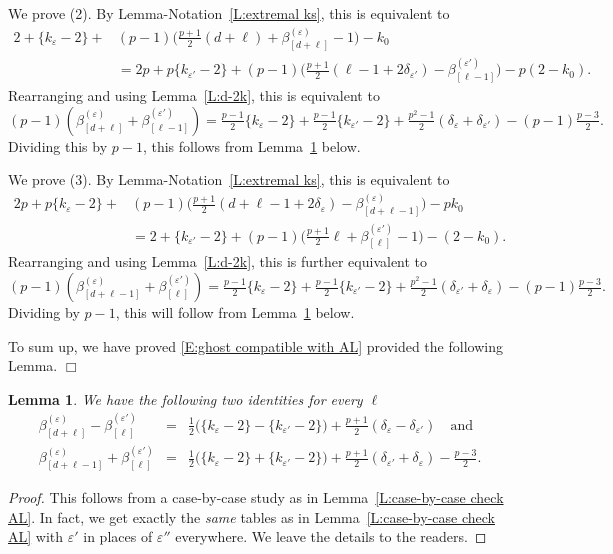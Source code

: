 \documentclass[12pt]{amsart}
\newtheorem{lemma}[subsection]{Lemma}
\theoremstyle{definition}
\numberwithin{equation}{subsection}
\begin{document}
We prove (2). By Lemma-Notation~\ref{L:extremal ks}, this is equivalent to
\begin{align*}
2 +\{k_{\varepsilon} -2\} + &(p-1) \big(\tfrac{p+1}2 (d+\ell) +\beta_{[d+\ell]}^{(\varepsilon)}-1\big) - k_0\\ & = 
2p +p\{k_{\varepsilon'} -2\} + (p-1) \big(\tfrac{p+1}2 ( \ell-1+2\delta_{\varepsilon'})- \beta_{[\ell-1]}^{(\varepsilon')}\big)   -p(2-k_0).
\end{align*}
Rearranging and using Lemma~\ref{L:d-2k}, this is equivalent to
$$  (p-1)(\beta_{[d+\ell]}^{(\varepsilon)}+ \beta_{[\ell-1]}^{(\varepsilon')} )=
\tfrac{p-1}2\{k_\varepsilon-2\} +\tfrac{p-1}2\{k_{\varepsilon'} - 2\} + \tfrac{p^2-1}2(  \delta_\varepsilon+\delta_{\varepsilon'}) -(p-1)\tfrac{p-3}2.
$$
Dividing this by $p-1$, this follows from Lemma~\ref{L:case-by-case check theta} below.

We prove (3). By Lemma-Notation~\ref{L:extremal ks}, this is equivalent to
\begin{align*}
2p +p\{k_{\varepsilon} -2\} + &(p-1) \big(\tfrac{p+1}2 (d+\ell-1+2\delta_{\varepsilon}) -\beta_{[d+\ell-1]}^{(\varepsilon)}\big) - pk_0
\\ & = 
2 +\{k_{\varepsilon'} -2\} + (p-1) \big(\tfrac{p+1}2 \ell +\beta_{[\ell]}^{(\varepsilon')}-1\big)   -(2-k_0).
\end{align*}
Rearranging and using Lemma~\ref{L:d-2k}, this is further equivalent to
$$(p-1)(\beta_{[d+\ell-1]}^{(\varepsilon)}+ \beta_{[\ell]}^{(\varepsilon')})=
\tfrac{p-1}2\{k_\varepsilon-2\} +\tfrac{p-1}2\{k_{\varepsilon'} - 2\} + \tfrac{p^2-1}2(\delta_{\varepsilon'} + \delta_\varepsilon) -(p-1)\tfrac{p-3}2.
$$
Dividing by $p-1$, this will follow from Lemma~\ref{L:case-by-case check theta} below.

To sum up, we have proved \eqref{E:ghost compatible with AL} provided the following Lemma. \hfill $\Box$

\begin{lemma}
\label{L:case-by-case check theta}
We have the following two identities for every $\ell$
\begin{eqnarray*}
\beta_{[d+\ell]}^{(\varepsilon)} - \beta_{[\ell]}^{(\varepsilon')} &=&  \tfrac 12\big(\{k _\varepsilon -2\} - \{k_{\varepsilon '}-2\}\big)+\tfrac{p+1}2( \delta_\varepsilon-\delta_{\varepsilon'})  \quad\textrm{and}
\\
\beta_{[d+\ell-1]}^{(\varepsilon)}+\beta_{[\ell]}^{(\varepsilon')}
&=&
\tfrac12\big(\{k_\varepsilon-2\} +\{k_{\varepsilon'}  - 2\}\big) + \tfrac{p+1}2(\delta_{\varepsilon'} + \delta_\varepsilon)-\tfrac{p-3}2.
\end{eqnarray*}
\end{lemma}
\begin{proof}
This follows from a case-by-case study as in Lemma~\ref{L:case-by-case check AL}. In fact, we get exactly the \emph{same} tables as in Lemma~\ref{L:case-by-case check AL} with $\varepsilon'$ in places of $\varepsilon''$ everywhere. We leave the details to the readers.
\end{proof}
\end{document}
